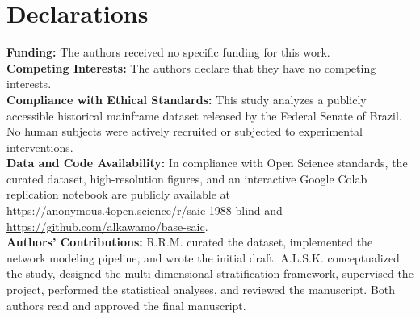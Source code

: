 \documentclass[pdflatex,sn-basic]{sn-jnl}
\begin{document}
\section*{Declarations}
\noindent\textbf{Funding:} The authors received no specific funding for this work.\\[3pt]
\noindent\textbf{Competing Interests:} The authors declare that they have no competing interests.\\[3pt]
\noindent\textbf{Compliance with Ethical Standards:} This study analyzes a publicly accessible historical mainframe dataset released by the Federal Senate of Brazil. No human subjects were actively recruited or subjected to experimental interventions.\\[3pt]
\noindent\textbf{Data and Code Availability:} In compliance with Open Science standards, the curated dataset, high-resolution figures, and an interactive Google Colab replication notebook are publicly available at \url{https://anonymous.4open.science/r/saic-1988-blind} and \url{https://github.com/alkawamo/base-saic}.\\[3pt]
\noindent\textbf{Authors' Contributions:} R.R.M. curated the dataset, implemented the network modeling pipeline, and wrote the initial draft. A.L.S.K. conceptualized the study, designed the multi-dimensional stratification framework, supervised the project, performed the statistical analyses, and reviewed the manuscript. Both authors read and approved the final manuscript.


\end{document}
